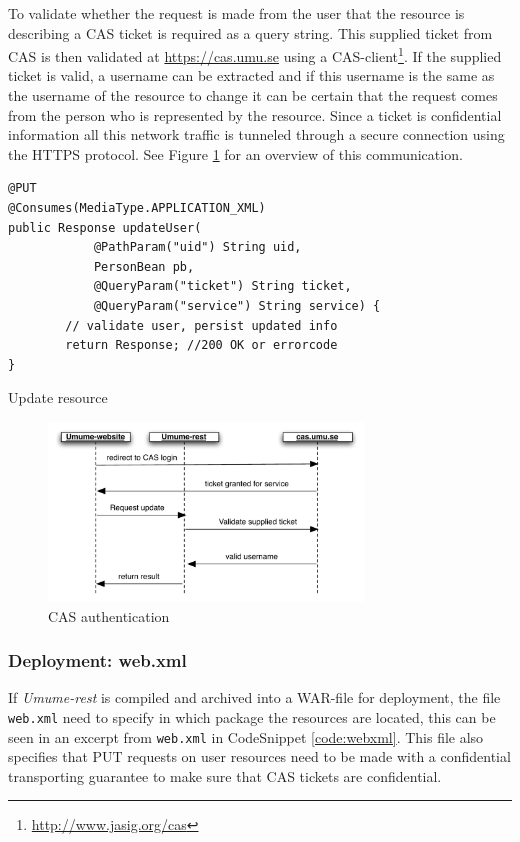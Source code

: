 \documentclass[titlepage, twocolumn, a4paper, 10pt]{article}
\begin{document}
To validate whether the request is made from the user that the
resource is describing a CAS ticket is required as a query string.
This supplied ticket from CAS is then validated at
\url{https://cas.umu.se} using a
CAS-client\footnote{\url{http://www.jasig.org/cas}}. If the supplied
ticket is valid, a username can be extracted and if this username is
the same as the username of the resource to change it can be certain
that the request comes from the person who is represented by the
resource. Since a ticket is confidential information all this network
traffic is tunneled through a secure connection using the HTTPS
protocol. See Figure \ref{fig:images/auth} for an overview of this
communication.

\begin{code}
  \begin{footnotesize}
\begin{verbatim}
@PUT
@Consumes(MediaType.APPLICATION_XML)
public Response updateUser(
            @PathParam("uid") String uid,
            PersonBean pb,
            @QueryParam("ticket") String ticket,
            @QueryParam("service") String service) {
        // validate user, persist updated info
        return Response; //200 OK or errorcode
}
\end{verbatim}
  \end{footnotesize}
  \caption{Update resource}\label{code:updateResource}
\end{code}

\begin{figure}[!thb]
  \centering
  \includegraphics[width=3.3in]{images/auth.pdf}
  \caption{CAS authentication}
  \label{fig:images/auth}
\end{figure}

\subsubsection{Deployment: web.xml}
If \textit{Umume-rest} is compiled and archived into a WAR-file for
deployment, the file \texttt{web.xml} need to specify in which package
the resources are located, this can be seen in an excerpt from
\texttt{web.xml} in CodeSnippet \vref{code:webxml}. This file also
specifies that PUT requests on user resources need to be made with a
confidential transporting guarantee to make sure that CAS tickets are
confidential.
\end{document}
